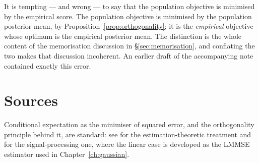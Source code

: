 \begin{pitfall}
It is tempting --- and wrong --- to say that the population objective is minimised by the
empirical score. The population objective is minimised by the population posterior mean, by
Proposition~\ref{prop:orthogonality}; it is the \emph{empirical} objective whose optimum is
the empirical posterior mean. The distinction is the whole content of the memorisation
discussion in \S\ref{sec:memorisation}, and conflating the two makes that discussion
incoherent. An earlier draft of the accompanying note contained exactly this error.
\end{pitfall}

\section*{Sources}
Conditional expectation as the minimiser of squared error, and the orthogonality principle
behind it, are standard: see \citet{lehmann1998} for the estimation-theoretic treatment and
\citet{kay1993} for the signal-processing one, where the linear case is developed as the LMMSE
estimator used in Chapter~\ref{ch:gaussian}.
